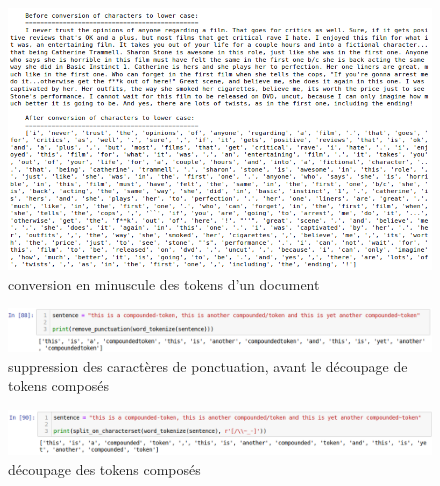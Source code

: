 \documentclass[12pt,a4paper]{report}
\theoremstyle{definition}
\begin{document}
\begin{appendices}
\begin{figure}[!ht]
  \centering
  \includegraphics[scale=0.6]{images/snapshots/preprocessing/lowercase.png}
  \caption{conversion en minuscule des tokens d'un document}
  \label{fig:lowercase}
\end{figure}

\begin{figure}[!ht]
  \centering
  \includegraphics[scale=0.45]{images/snapshots/preprocessing/before_split_characterset.png}
  \caption{suppression des caractères de ponctuation, avant le découpage de tokens composés}
  \label{fig:before_split_characterset}
\end{figure}

\begin{figure}[!ht]
  \centering
  \includegraphics[scale=0.45]{images/snapshots/preprocessing/after_split_characterset.png}
  \caption{découpage des tokens composés}
  \label{fig:after_split_characterset}
\end{figure}


\end{appendices}
\end{document}
